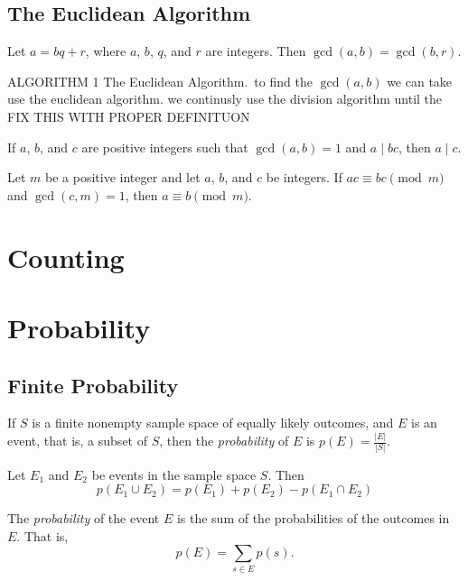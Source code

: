\documentclass{article}
\begin{document}
\subsection{The Euclidean Algorithm}
\begin{theorem}
    Let \( a = bq + r \), where \(a \), \(b \), \(q \), and \(r \) are integers. Then \( \gcd(a, b) = \gcd(b, r)\).
\end{theorem}
\begin{theorem}
    ALGORITHM 1 The Euclidean Algorithm.\
    to find the \( \gcd(a, b)\) we can take use the euclidean algorithm. we continusly use the division algorithm until
    the FIX THIS WITH PROPER DEFINITUON
\end{theorem}
\begin{theorem}
    If \(a \), \(b \), and \(c \) are positive integers such that \( \gcd(a,b) = 1\) and \(a \mid bc\), then \(a \mid c \).
\end{theorem}
\begin{theorem}
    Let \( m \) be a positive integer and let \( a \), \( b \), and \( c \) be integers. If \( ac \equiv bc \pmod{m} \) and \( \gcd(c,m) = 1 \), then \( a \equiv b \pmod{m}. \)
\end{theorem}

\section{Counting}


\section{Probability}
\subsection{Finite Probability}
\begin{theorem}
    If \( S \) is a finite nonempty sample space of equally likely outcomes, and \( E \) is an event, that is, a subset of \( S \), then the \textit{probability} of \( E \) is \( p(E) = \frac{|E|}{|S|} \).
\end{theorem}
\begin{theorem}
    Let \(E_1 \) and \(E_2\) be events in the sample space \(S \). Then \
    \[
    p(E_1 \cup E_2) = p(E_1) + p(E_2) - p(E_1 \cap E_2)
    \]
\end{theorem}
\begin{definition}
    The \textit{probability} of the event \( E \) is the sum of the probabilities of the outcomes in \( E \). That is,
    \[p(E) = \sum_{s \in E} p(s).\]
\end{definition}
\end{document}
